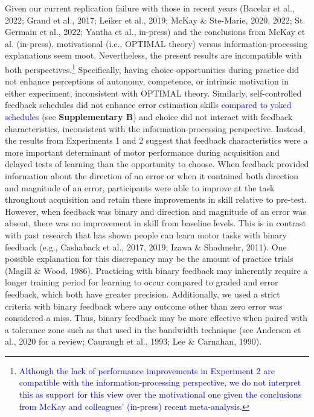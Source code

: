 \documentclass[
  man, donotrepeattitle,floatsintext]{apa7}
\begin{document}
Given our current replication failure with those in recent years (Bacelar et al., 2022; Grand et al., 2017; Leiker et al., 2019; McKay \& Ste-Marie, 2020, 2022; St. Germain et al., 2022; Yantha et al., in-press) and the conclusions from McKay et al. (in-press), motivational (i.e., OPTIMAL theory) versus information-processing explanations seem moot. Nevertheless, the present results are incompatible with both perspectives.\footnote{\textcolor{blue}{Although the lack of performance improvements in Experiment 2 are compatible with the information-processing perspective, we do not interpret this as support for this view over the motivational one given the conclusions from McKay and colleagues' (in-press) recent meta-analysis.}} Specifically, having choice opportunities during practice did not enhance perceptions of autonomy, competence, or intrinsic motivation in either experiment, inconsistent with OPTIMAL theory. Similarly, self-controlled feedback schedules did not enhance error estimation skills \textcolor{blue}{compared to yoked schedules} (see \textbf{Supplementary B}) and choice did not interact with feedback characteristics, inconsistent with the information-processing perspective. Instead, the results from Experiments 1 and 2 suggest that feedback characteristics were a more important determinant of motor performance during acquisition and delayed tests of learning than the opportunity to choose. When feedback provided information about the direction of an error or when it contained both direction and magnitude of an error, participants were able to improve at the task throughout acquisition and retain these improvements in skill relative to pre-test. However, when feedback was binary and direction and magnitude of an error was absent, there was no improvement in skill from baseline levels. This is in contrast with past research that has shown people can learn motor tasks with binary feedback (e.g., Cashaback et al., 2017, 2019; Izawa \& Shadmehr, 2011). One possible explanation for this discrepancy may be the amount of practice trials (Magill \& Wood, 1986). Practicing with binary feedback may inherently require a longer training period for learning to occur compared to graded and error feedback, which both have greater precision. Additionally, we used a strict criteria with binary feedback where any outcome other than zero error was considered a miss. Thus, binary feedback may be more effective when paired with a tolerance zone such as that used in the bandwidth technique (see Anderson et al., 2020 for a review; Cauraugh et al., 1993; Lee \& Carnahan, 1990).
\end{document}
